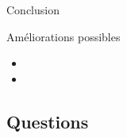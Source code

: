 \begin{frame}{Conclusion}
        \begin{block}{Améliorations possibles}
            \begin{itemize}
                \item 
                \item 
            \end{itemize}
          \end{block}
\end{frame}

\subsection{Questions}

{
\begin{frame}[plain]
    
\end{frame}
}